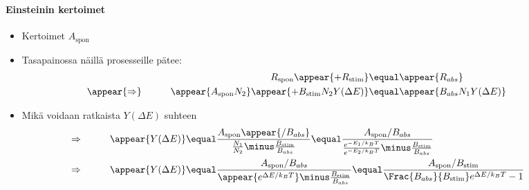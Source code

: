 \begin{frame}
\frametitle{\texorpdfstring{\culine[\sectiontitleulinecolor]{\sectiontitle}}{\sectiontitle} }
\framesubtitle{Einsteinin kertoimet}
\appear{}

\begin{itemize}
	\item Kertoimet $A_{\text {spon}}$  
	
	\item Tasapainossa näillä prosesseille pätee:
\[
\begin{aligned}
& & R_{\text {spon}} \appear{+R_{\text {stim}}}  &\equal \appear{R_{abs}} \\
 &\appear{\Rightarrow}& \qquad \appear{A_{\text {spon}} N_{2}} \appear{+B_{\text {stim}} N_{2} Y(\Delta E)} & \equal \appear{B_{abs} N_{1} Y(\Delta E)} \qquad \quad 
\end{aligned}
\]

\item Mikä voidaan ratkaista $Y(\Delta E)$ suhteen
\[
\begin{aligned}
&\Rightarrow& 
\qquad \appear{Y(\Delta E)} & \equal \frac{A_{\text {spon}} \appear{/ B_{abs}}}{\frac{N_{1}}{N_{2}}  \minus \frac{B_{\text {stim}}}{B_{abs}}}
 \equal 
 \frac{A_{\text {spon}} / B_{abs}}{\frac{e^{-E_{1} / k_{B} T}}{e^{-E_{2} / k_{B} T}}  \minus \frac{B_{\text{stim}}}{B_{abs}}} \\
 \vspace{6mm}
&\Rightarrow&
 \appear{Y(\Delta E)} & \equal \frac{A_{\text {spon}} / B_{abs}}{\appear{e^{\Delta E / k_{B} T}}  \minus \frac{B_{\text {stim}}}{B_{abs}}}
  \equal 
  \frac{A_{\text {spon}} / B_{\text {stim}}}{\Frac{B_{abs}}{B_{\text{stim}}} e^{\Delta E / k_{B} T}-1}  \qquad \quad 
\end{aligned}
\]
\end{itemize}

\endofslide 
\end{frame}

